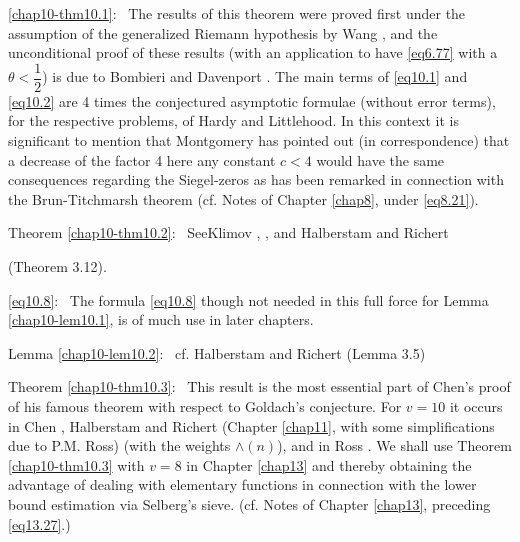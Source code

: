 \ref{chap10-thm10.1}:~
The results of this theorem were proved first under the assumption of
the generalized Riemann hypothesis by Wang \cite{key2}, and the
unconditional proof of these results (with an application to have
\eqref{eq6.77} with a $ \theta < \dfrac{1}{2}$) is due to Bombieri and
Davenport \cite{key1}. The main terms of \eqref{eq10.1} and
\eqref{eq10.2} are 4 times 
the conjectured asymptotic formulae (without error terms), for the
respective problems, of Hardy and Littlehood. In this context it is
significant to mention that Montgomery has pointed out (in
correspondence) that a decrease of the factor 4 here any constant
$c<4$ would have the same consequences regarding the Siegel-zeros as
has been remarked in connection with the Brun-Titchmarsh theorem
(cf. Notes of Chapter \ref{chap8}, under \eqref{eq8.21}). 


Theorem \ref{chap10-thm10.2}:~
See\pageoriginale Klimov \cite{key1}, \cite{key2}, and Halberstam and
Richert \cite{key1}  

(Theorem 3.12).  

\eqref{eq10.8}:~ The formula \eqref{eq10.8} though not needed in this
full force for Lemma \ref{chap10-lem10.1}, is of much use in later chapters. 

Lemma \ref{chap10-lem10.2}:~
cf. Halberstam and Richert \cite{key1} (Lemma 3.5)

Theorem \ref{chap10-thm10.3}:~
This result is the most essential part of Chen's proof of his famous
theorem with respect to Goldach's conjecture. For $v=10$ it
occurs in Chen \cite{key1}, Halberstam and Richert \cite{key1}
(Chapter \ref{chap11}, with 
some simplifications due to P.M. Ross) (with the weights $\wedge (n)$),
and in Ross \cite{key1}. We shall use Theorem \ref{chap10-thm10.3} 
with $v=8$ in Chapter
\ref{chap13} and thereby obtaining the advantage of dealing with elementary
functions in connection with the lower bound estimation via Selberg's
sieve. (cf. Notes of Chapter \ref{chap13}, preceding \eqref{eq13.27}.) 


